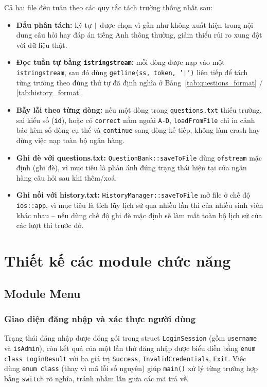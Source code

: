 \documentclass[11pt]{report}
\begin{document}
Cả hai file đều tuân theo các quy tắc tách trường thống nhất sau:

\begin{itemize}[leftmargin=*]
    \item \textbf{Dấu phân tách:} ký tự \texttt{|} được chọn vì gần như không xuất hiện trong nội dung câu hỏi hay đáp án tiếng Anh thông thường, giảm thiểu rủi ro xung đột với dữ liệu thật.
    \item \textbf{Đọc tuần tự bằng \texttt{istringstream}:} mỗi dòng được nạp vào một \texttt{istringstream}, sau đó dùng \texttt{getline(ss, token, '|')} liên tiếp để tách từng trường theo đúng thứ tự đã định nghĩa ở Bảng~\ref{tab:questions_format} / \ref{tab:history_format}.
    \item \textbf{Bẫy lỗi theo từng dòng:} nếu một dòng trong \texttt{questions.txt} thiếu trường, sai kiểu số (\texttt{id}), hoặc có \texttt{correct} nằm ngoài \texttt{A-D}, \texttt{loadFromFile} chỉ in cảnh báo kèm số dòng cụ thể và \texttt{continue} sang dòng kế tiếp, không làm crash hay dừng việc nạp toàn bộ ngân hàng.
    \item \textbf{Ghi đè với questions.txt:} \texttt{QuestionBank::saveToFile} dùng \texttt{ofstream} mặc định (ghi đè), vì mục tiêu là phản ánh đúng trạng thái hiện tại của ngân hàng câu hỏi sau khi thêm/xoá.
    \item \textbf{Ghi nối với history.txt:} \texttt{HistoryManager::saveToFile} mở file ở chế độ \texttt{ios::app}, vì mục tiêu là tích lũy lịch sử qua nhiều lần thi của nhiều sinh viên khác nhau -- nếu dùng chế độ ghi đè mặc định sẽ làm mất toàn bộ lịch sử của các lượt thi trước đó.
\end{itemize}

\section{Thiết kế các module chức năng}

\subsection{Module Menu}

\subsubsection{Giao diện đăng nhập và xác thực người dùng}

Trạng thái đăng nhập được đóng gói trong struct \texttt{LoginSession} (gồm \texttt{username} và \texttt{isAdmin}), còn kết quả của một lần thử đăng nhập được biểu diễn bằng \texttt{enum class LoginResult} với ba giá trị \texttt{Success}, \texttt{InvalidCredentials}, \texttt{Exit}. Việc dùng \texttt{enum class} (thay vì mã lỗi số nguyên) giúp \texttt{main()} xử lý từng trường hợp bằng \texttt{switch} rõ nghĩa, tránh nhầm lẫn giữa các mã trả về.
\end{document}
